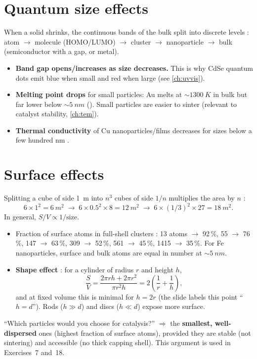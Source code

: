 \section{Quantum size effects}
When a solid shrinks, the continuous bands of the bulk split into discrete levels
: atom $\to$ molecule (HOMO/LUMO) $\to$ cluster $\to$ nanoparticle $\to$ bulk
(semiconductor with a gap, or metal).
\begin{itemize}
  \item \textbf{Band gap opens/increases as size decreases.} This is why CdSe quantum dots
        emit blue when small and red when large  (see \cref{ch:uvvis}).
  \item \textbf{Melting point drops} for small particles: Au melts at $\sim\SI{1300}{K}$ in bulk but far lower below
        $\sim\SI{5}{nm}$ (). Small particles are easier to sinter (relevant to catalyst stability, \cref{ch:tem}).
  \item \textbf{Thermal conductivity} of Cu nanoparticles/films decreases for sizes below a few hundred nm .
\end{itemize}

\section{Surface effects}
\begin{keybox}
Splitting a cube of side \SI{1}{m} into $n^3$ cubes of side $1/n$ multiplies the area by $n$ :
\[
6\times 1^2 = \SI{6}{m^2} \;\to\; 6\times 0.5^2\times 8 = \SI{12}{m^2} \;\to\; 6\times(1/3)^2\times 27 = \SI{18}{m^2}.
\]
In general, $S/V \propto 1/\text{size}$.
\end{keybox}
\begin{itemize}
  \item Fraction of surface atoms in full-shell clusters : 13 atoms $\to$ 92\,\%, 55 $\to$ 76\,\%,
        147 $\to$ 63\,\%, 309 $\to$ 52\,\%, 561 $\to$ 45\,\%, 1415 $\to$ 35\,\%.
        For Fe nanoparticles, surface and bulk atoms are equal in number at $\sim\SI{5}{nm}$.
\item \textbf{Shape effect} : for a cylinder of radius $r$ and height $h$,
        \[ \frac{S}{V} = \frac{2\pi r h + 2\pi r^2}{\pi r^2 h} = 2\left(\frac{1}{r}+\frac{1}{h}\right), \]
        and at fixed volume this is minimal for $h = 2r$ (the slide labels this point ``$h=d$'').
        Rods ($h\gg d$) and discs ($h\ll d$) expose more surface.
\end{itemize}
\begin{tipbox}
``Which particles would you choose for catalysis?'' $\Rightarrow$ the \textbf{smallest, well-dispersed} ones
(highest fraction of surface atoms), provided they are stable (not sintering) and accessible (no thick capping
shell). This argument is used in Exercises~7 and~18.
\end{tipbox}

